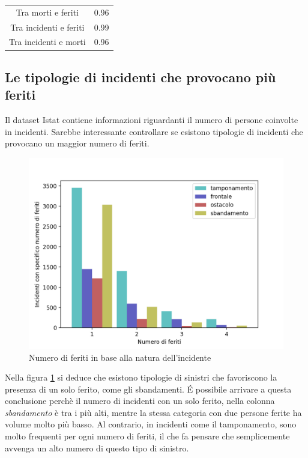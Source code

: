 \documentclass[a4paper]{report}
\begin{document}
\begin{center}
    \def\arraystretch{1.5}%
    \begin{tabular}{ |c|c| }
        \hline
        \rowcolor{TableGray}
        Tra morti e feriti     & 0.96 \\ 
        Tra incidenti e feriti  & 0.99 \\
        \rowcolor{TableGray}
        Tra incidenti e morti   & 0.96 \\
        \hline
    \end{tabular}
\end{center}


\subsection{Le tipologie di incidenti che provocano più feriti}

Il dataset Istat contiene informazioni riguardanti il numero di persone coinvolte in incidenti.
Sarebbe interessante controllare se esistono tipologie di incidenti che provocano 
un maggior numero di feriti.

\begin{figure}
    \includegraphics[width=\linewidth]{../src/incidenti/incidenti_senza_coords/natura_incidente/natura_incidente.png}
    \caption{Numero di feriti in base alla natura dell'incidente}
    \label{fig:numero-feriti}
\end{figure}

Nella figura \ref{fig:numero-feriti} si deduce che esistono tipologie di sinistri che 
favoriscono la presenza di un solo ferito, come gli sbandamenti. 
\'E possibile arrivare a questa conclusione perchè il numero di incidenti con un solo ferito, 
nella colonna \textit{sbandamento} è tra i più alti, mentre la stessa categoria con due persone 
ferite ha volume molto più basso.
Al contrario, in incidenti come il tamponamento, sono molto frequenti per ogni 
numero di feriti, il che fa pensare che semplicemente avvenga un alto numero di 
questo tipo di sinistro.
\end{document}
